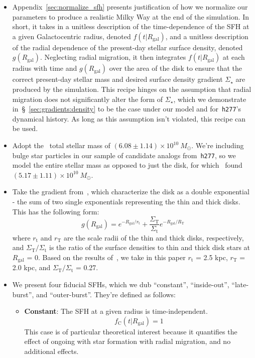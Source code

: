 \documentclass[a4paper, fleqn, usenatbib, useAMS]{mnras}
\begin{document}
\begin{itemize} 
	\item Appendix~\ref{sec:normalize_sfh} presents justification of how we 
	normalize our parameters to produce a realistic Milky Way at the end of 
	the simulation. In short, it takes in a unitless description of the 
	time-dependence of the SFH at a given Galactocentric radius, denoted 
	$f(t|R_\text{gal})$, and a unitless description of the radial dependence of 
	the present-day stellar surface density, denoted $g(R_\text{gal})$. 
	Neglecting radial migration, it then integrates $f(t|R_\text{gal})$ at each 
	radius with time and $g(R_\text{gal})$ over the area of the disk to ensure 
	that the correct present-day stellar mass and desired surface density 
	gradient $\Sigma_\star$ are produced by the simulation. This recipe hinges 
	on the assumption that radial migration does not significantly alter the 
	form of $\Sigma_\star$, which we demonstrate 
	in~\S~\ref{sec:gradients:density} to be the case under our model and 
	for~\texttt{h277}'s dynamical history. As long as this assumption isn't 
	violated, this recipe can be used. 

	\item Adopt the~\citet{Licquia2015} total stellar mass of 
	$(6.08\pm1.14)\times10^{10}~M_\odot$. We're including bulge star particles 
	in our sample of candidate analogs from~\texttt{h277}, so we model the 
	entire stellar mass as opposed to just the disk, for 
	which~\citet{Licquia2015} found $(5.17\pm1.11)\times10^{10}~M_\odot$. 

	\item Take the gradient from~\citet{Bland-Hawthorn2016}, which characterize 
	the disk as a double exponential - the sum of two single exponentials 
	representing the thin and thick disks. This has the following form: 
	\begin{equation} 
	g(R_\text{gal}) = e^{-R_\text{gal}/r_\text{t}} + 
	\frac{\Sigma_\text{T}}{\Sigma_\text{t}}e^{-R_\text{gal}/R_\text{T}} 
	\end{equation} 
	where $r_\text{t}$ and $r_\text{T}$ are the scale radii of the thin and 
	thick disks, respectively, and $\Sigma_\text{T}/\Sigma_\text{t}$ is the 
	ratio of the surface densities to thin and thick disk stars at 
	$R_\text{gal}$ = 0. Based on the results of~\citet{Bland-Hawthorn2016}, we 
	take in this paper $r_\text{t}$ = 2.5 kpc, $r_\text{T}$ = 2.0 kpc, and 
	$\Sigma_\text{T}/\Sigma_\text{t}$ = 0.27. 

	\item We present four fiducial SFHs, which we dub ``constant'', 
	``inside-out'', ``late-burst'', and ``outer-burst''. They're defined as 
	follows: 
	\begin{itemize} 
		\item \textbf{Constant}: The SFH at a given radius is time-independent. 
		\begin{equation} 
		f_\text{C}(t|R_\text{gal}) = 1 
		\label{eq:constant_sfh} 
		\end{equation} 
		This case is of particular theoretical interest because it quantifies 
		the effect of ongoing with star formation with radial migration, and 
		no additional effects. 


\end{itemize}
\end{itemize}
\end{document}
